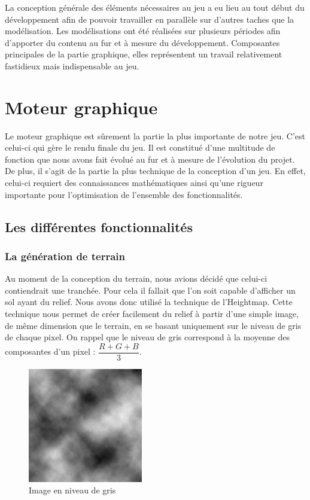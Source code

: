 \documentclass[11pt]{report}
\begin{document}
La conception générale des éléments nécessaires au jeu a eu lieu au tout début du développement afin de pouvoir travailler en parallèle sur d’autres taches que la modélisation. Les modélisations ont été réalisées sur plusieurs périodes afin d’apporter du contenu au fur et à mesure du développement. Composantes principales de la partie graphique, elles représentent un travail relativement fastidieux mais indispensable au jeu. 

\chapter{Moteur graphique}

Le moteur graphique est sûrement la partie la plus importante de notre jeu. C'est celui-ci qui gère le rendu finale du jeu. Il est constitué d'une multitude de fonction que nous avons fait évolué au fur et à mesure de l'évolution du projet. De plus, il s'agit de la partie la plus technique de la conception d'un jeu. En effet, celui-ci requiert des connaissances mathématiques ainsi qu'une rigueur importante pour l'optimisation de l'ensemble des fonctionnalités.

\section{Les différentes fonctionnalités}

\subsection{La génération de terrain}

Au moment de la conception du terrain, nous avions décidé que celui-ci contiendrait une tranchée. Pour cela il fallait que l'on soit capable d'afficher un sol ayant du relief. Nous avons donc utilisé la technique de l'Heightmap. Cette technique nous permet de créer facilement du relief à partir d'une simple image, de même dimension que le terrain, en se basant uniquement sur le niveau de gris de chaque pixel. On rappel que le niveau de gris correspond à la moyenne des composantes d'un pixel : \( \dfrac{R + G + B}{3} \). 

\begin{figure}[htbp]
\centering
\includegraphics[width=5cm]{heightmap-texture.png}
\caption{Image en niveau de gris}
\label{fig-heightmap-texture}
\end{figure}
\end{document}

